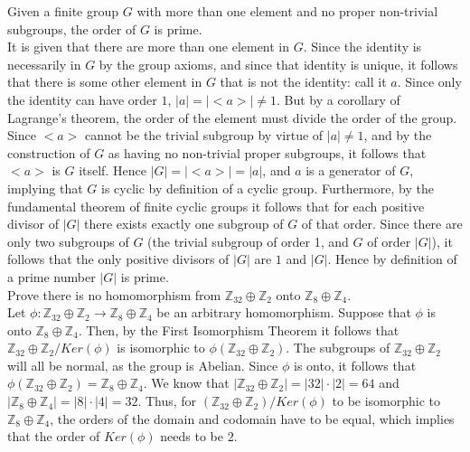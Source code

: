 \documentclass{article}
\theoremstyle{definition}
\newcommand{\Z}{\mathbb{Z}}
\begin{document}
 Given a finite group $G$ with more than one element and no proper non-trivial subgroups, the order of $G$ is prime.\\

 It is given that there are more than one element in $G$. Since the identity is necessarily in $G$ by the group axioms, and since that identity is unique, it follows that there is some other element in $G$ that is not the identity: call it $a$. Since only the identity can have order $1$, $|a| = |<a>| \ne 1$. But by a corollary of Lagrange's theorem, the order of the element must divide the order of the group. Since $<a>$ cannot be the trivial subgroup by virtue of $|a| \ne 1$, and by the construction of $G$ as having no non-trivial proper subgroups, it follows that $<a>$ is $G$ itself. Hence $|G| = |<a>| = |a|$, and $a$ is a generator of $G$, implying that $G$ is cyclic by definition of a cyclic group. Furthermore, by the fundamental theorem of finite cyclic groups it follows that for each positive divisor of $|G|$ there exists exactly one subgroup of $G$ of that order. Since there are only two subgroups of $G$ (the trivial subgroup of order 1, and $G$ of order $|G|$), it follows that the only positive divisors of $|G|$ are $1$ and $|G|$. Hence by definition of a prime number $|G|$ is prime.\\


 Prove there is no homomorphism from $\Z_{32}\oplus \Z_2$ onto $\Z_8\oplus\Z_4$.\\

 Let $\phi: \Z_{32}\oplus \Z_2 \longrightarrow \Z_8\oplus \Z_4$ be an arbitrary homomorphism. Suppose that $\phi$ is onto $\Z_8 \oplus \Z_4$. Then, by the First Isomorphism Theorem it follows that $\Z_{32}\oplus \Z_2/Ker(\phi)$ is isomorphic to $\phi(\Z_{32}\oplus \Z_2)$. The subgroups of $\Z_{32}\oplus \Z_2$ will all be normal, as the group is Abelian. Since $\phi$ is onto, it follows that $\phi(\Z_{32}\oplus \Z_2) = \Z_8\oplus \Z_4$. We know that $|\Z_{32}\oplus \Z_2| = |32|\cdot|2| = 64$ and $|\Z_8\oplus \Z_4| = |8|\cdot|4| = 32$. Thus, for $(\Z_{32}\oplus \Z_2)/Ker(\phi)$ to be isomorphic to $\Z_8\oplus \Z_4$, the orders of the domain and codomain have to be equal, which implies that the order of $Ker(\phi)$ needs to be $2$. \\
\end{document}

